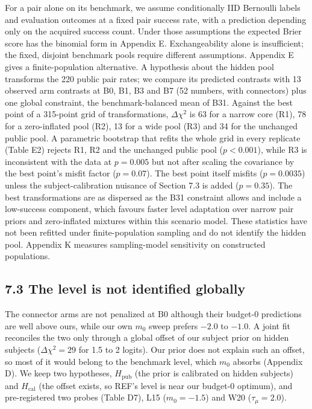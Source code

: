 \documentclass[
]{article}
\begin{document}
For a pair alone on its benchmark, we assume conditionally IID Bernoulli
labels and evaluation outcomes at a fixed pair success rate, with a
prediction depending only on the acquired success count. Under those
assumptions the expected Brier score has the binomial form in Appendix
E. Exchangeability alone is insufficient; the fixed, disjoint benchmark
pools require different assumptions. Appendix E gives a
finite-population alternative. A hypothesis about the hidden pool
transforms the 220 public pair rates; we compare its predicted contrasts
with 13 observed arm contrasts at B0, B1, B3 and B7 (52 numbers, with
connectors) plus one global constraint, the benchmark-balanced mean of
B31. Against the best point of a 315-point grid of transformations,
\(\Delta\chi^2\) is 63 for a narrow core (R1), 78 for a zero-inflated
pool (R2), 13 for a wide pool (R3) and 34 for the unchanged public pool.
A parametric bootstrap that refits the whole grid in every replicate
(Table E2) rejects R1, R2 and the unchanged public pool (\(p < 0.001\)),
while R3 is inconsistent with the data at \(p = 0.005\) but not after
scaling the covariance by the best point's misfit factor (\(p = 0.07\)).
The best point itself misfits (\(p = 0.0035\)) unless the
subject-calibration nuisance of Section 7.3 is added (\(p = 0.35\)). The
best transformations are as dispersed as the B31 constraint allows and
include a low-success component, which favours faster level adaptation
over narrow pair priors and zero-inflated mixtures within this scenario
model. These statistics have not been refitted under finite-population
sampling and do not identify the hidden pool. Appendix K measures
sampling-model sensitivity on constructed populations.

\subsection{7.3 The level is not identified
globally}\label{the-level-is-not-identified-globally}

The connector arms are not penalized at B0 although their budget-0
predictions are well above ours, while our own \(m_0\) sweep prefers
\(-2.0\) to \(-1.0\). A joint fit reconciles the two only through a
global offset of our subject prior on hidden subjects
(\(\Delta\chi^2 = 29\) for 1.5 to 2 logits). Our prior does not explain
such an offset, so most of it would belong to the benchmark level, which
\(m_0\) absorbs (Appendix D). We keep two hypotheses,
\(H_{\mathrm{pub}}\) (the prior is calibrated on hidden subjects) and
\(H_{\mathrm{cal}}\) (the offset exists, so REF's level is near our
budget-0 optimum), and pre-registered two probes (Table D7), L15
(\(m_0 = -1.5\)) and W20 (\(\tau_\mu = 2.0\)).
\end{document}
